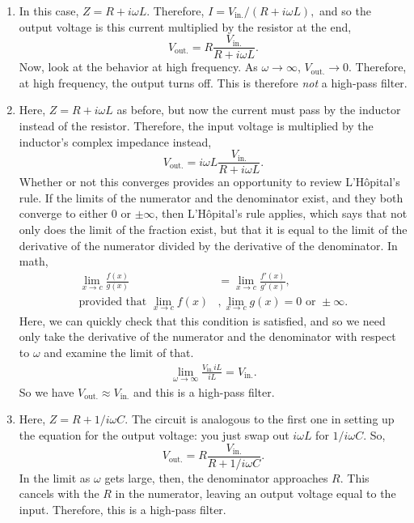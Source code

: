 \documentclass[11pt]{paper}
\begin{document}
\begin{enumerate}[label=\Roman*.]
\item In this case, $Z = R + i\omega L$.  Therefore, $I = V_\text{in.}/\left(R+i\omega L\right),$ and so the output voltage is this current multiplied by the resistor at the end,
\begin{equation}
V_\text{out.} = R\frac{V_\text{in.}}{R+i\omega L}.
\end{equation}
Now, look at the behavior at high frequency.  As $\omega \rightarrow \infty$, $V_\text{out.} \rightarrow 0$.  Therefore, at high frequency, the output turns off.  This is therefore \emph{not} a high-pass filter.

\item Here, $Z = R + i\omega L$ as before, but now the current must pass by the inductor instead of the resistor.  Therefore, the input voltage is multiplied by the inductor's complex impedance instead,
\begin{equation}
V_\text{out.} = i\omega L\frac{V_\text{in.}}{R+i\omega L}. 
\end{equation}
Whether or not this converges provides an opportunity to review L'H\^{o}pital's rule.  If the limits of the numerator and the denominator exist, and they both converge to either $0$ or $\pm \infty$, then L'H\^{o}pital's rule applies, which says that not only does the limit of the fraction exist, but that it is equal to the limit of the derivative of the numerator divided by the derivative of the denominator.  In math,
\begin{align}
\lim_{x\rightarrow c} \frac{f(x)}{g(x)} &= \lim_{x\rightarrow c} \frac{f'(x)}{g'(x)},\\
\text{provided that } \lim_{x\rightarrow c} f(x) &, \lim_{x\rightarrow c} g(x) = 0 \text{ or } \pm \infty.
\end{align}
Here, we can quickly check that this condition is satisfied, and so we need only take the derivative of the numerator and the denominator with respect to $\omega$ and examine the limit of that.
\begin{align}
\lim_{\omega\rightarrow \infty} \frac{V_\text{in.} i L}{iL} = V_\text{in.}.
\end{align}
So we have $V_\text{out.} \approx V_\text{in.}$ and this is a high-pass filter.

\item Here, $Z = R + 1/i\omega C$.  The circuit is analogous to the first one in setting up the equation for the output voltage: you just swap out $i \omega L$ for $1/i\omega C$.  So,
\begin{equation}
V_\text{out.} = R\frac{V_\text{in.}}{R+1/i\omega C}.
\end{equation}
In the limit as $\omega$ gets large, then, the denominator approaches $R$.  This cancels with the $R$ in the numerator, leaving an output voltage equal to the input.  Therefore, this is a high-pass filter.


\end{enumerate}
\end{document}
